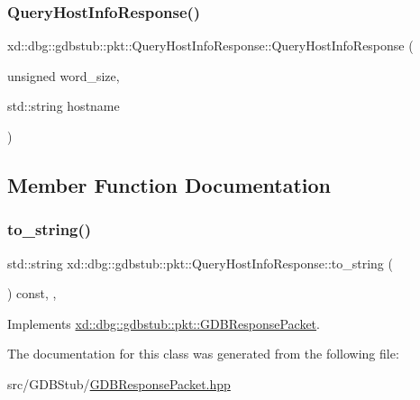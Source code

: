 \subsubsection{\texorpdfstring{Query\+Host\+Info\+Response()}{QueryHostInfoResponse()}}
{\footnotesize\ttfamily xd\+::dbg\+::gdbstub\+::pkt\+::\+Query\+Host\+Info\+Response\+::\+Query\+Host\+Info\+Response (\begin{DoxyParamCaption}\item[{unsigned}]{word\+\_\+size,  }\item[{std\+::string}]{hostname }\end{DoxyParamCaption})\hspace{0.3cm}{\ttfamily [inline]}}



\subsection{Member Function Documentation}
\mbox{\label{classxd_1_1dbg_1_1gdbstub_1_1pkt_1_1_query_host_info_response_abbb6673484d04cacc50302aed62f4ed5}} 
\subsubsection{\texorpdfstring{to\+\_\+string()}{to\_string()}}
{\footnotesize\ttfamily std\+::string xd\+::dbg\+::gdbstub\+::pkt\+::\+Query\+Host\+Info\+Response\+::to\+\_\+string (\begin{DoxyParamCaption}{ }\end{DoxyParamCaption}) const\hspace{0.3cm}{\ttfamily [inline]}, {\ttfamily [override]}, {\ttfamily [virtual]}}



Implements \mbox{\hyperlink{classxd_1_1dbg_1_1gdbstub_1_1pkt_1_1_g_d_b_response_packet_a2a15795536cd5ff94f0533c406233874}{xd\+::dbg\+::gdbstub\+::pkt\+::\+G\+D\+B\+Response\+Packet}}.



The documentation for this class was generated from the following file\+:\begin{DoxyCompactItemize}
\item 
src/\+G\+D\+B\+Stub/\mbox{\hyperlink{_g_d_b_response_packet_8hpp}{G\+D\+B\+Response\+Packet.\+hpp}}\end{DoxyCompactItemize}
